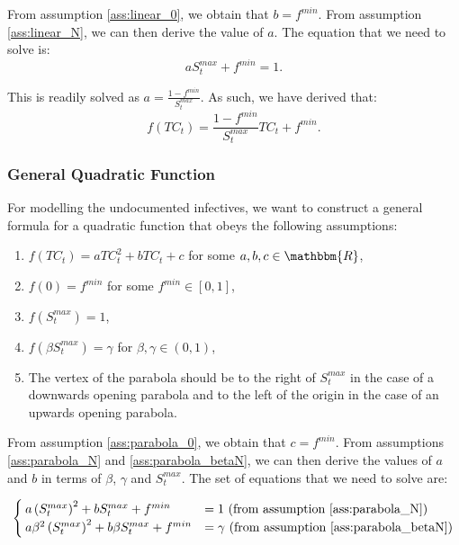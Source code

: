 \documentclass[12pt]{article}
\newcommand{\R}{\mathbbm{R}}
\begin{document}
\begin{appendices}
		From assumption \ref{ass:linear_0}, we obtain that $b = f^{min}$. From assumption \ref{ass:linear_N}, we can then derive the value of $a$. The equation that we need to solve is:
		    \[aS^{max}_t + f^{min} = 1.\]
		    
		\noindent This is readily solved as $a = \frac{1-f^{min}}{S^{max}_t}$. As such, we have derived that:
		    \[f(TC_t) = \frac{1-f^{min}}{S^{max}_t}TC_t + f^{min}.\]
		
		\subsubsection{General Quadratic Function} \label{ssapp:quadratic_derivation}
		For modelling the undocumented infectives, we want to construct a general formula for a quadratic function that obeys the following assumptions:
		\begin{enumerate}[label=(\Roman*)]
		    \item\label{ass:parabola_formula} $f(TC_t) = aTC_t^2 + bTC_t + c$ for some $a, b, c \in \R$,
		    \item\label{ass:parabola_0} $f(0) = f^{min}$ for some $f^{min} \in [0,1]$,
		    \item\label{ass:parabola_N} $f(S^{max}_t) = 1$,
		    \item\label{ass:parabola_betaN} $f(\beta S^{max}_t) = \gamma$ for $\beta, \gamma \in (0,1)$,
		    \item\label{ass:parabola_vertex} The vertex of the parabola should be to the right of $S^{max}_t$ in the case of a downwards opening parabola and to the left of the origin in the case of an upwards opening parabola.
		\end{enumerate}
		
		From assumption \ref{ass:parabola_0}, we obtain that $c = f^{min}$. From assumptions \ref{ass:parabola_N} and \ref{ass:parabola_betaN}, we can then derive the values of $a$ and $b$ in terms of $\beta$, $\gamma$ and $S^{max}_t$. The set of equations that we need to solve are:
		
		\begin{equation} \label{eq:set_parabola}
		    \begin{cases}
		        a\left(S^{max}_t\right)^2 + bS^{max}_t + f^{min} &= 1 \text{ (from assumption \ref{ass:parabola_N})}\\
		        a\beta^2 \left(S^{max}_t\right)^2 + b\beta S^{max}_t + f^{min} &= \gamma \text{ (from assumption \ref{ass:parabola_betaN})}
		    \end{cases}
		\end{equation}
		

\end{appendices}
\end{document}
